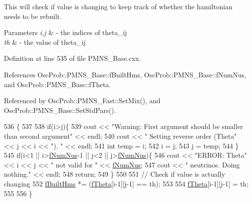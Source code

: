 This will check if value is changing to keep track of whether the hamiltonian needs to be rebuilt.


\begin{DoxyParams}{Parameters}
{\em i,j} & -\/ the indices of theta\+\_\+ij \\
\hline
{\em th} & -\/ the value of theta\+\_\+ij \\
\hline
\end{DoxyParams}


Definition at line 535 of file P\+M\+N\+S\+\_\+\+Base.\+cxx.



References Osc\+Prob\+::\+P\+M\+N\+S\+\_\+\+Base\+::f\+Built\+Hms, Osc\+Prob\+::\+P\+M\+N\+S\+\_\+\+Base\+::f\+Num\+Nus, and Osc\+Prob\+::\+P\+M\+N\+S\+\_\+\+Base\+::f\+Theta.



Referenced by Osc\+Prob\+::\+P\+M\+N\+S\+\_\+\+Fast\+::\+Set\+Mix(), and Osc\+Prob\+::\+P\+M\+N\+S\+\_\+\+Base\+::\+Set\+Std\+Pars().


\begin{DoxyCode}
536 \{
537 
538   \textcolor{keywordflow}{if}(i>j)\{
539     cout << \textcolor{stringliteral}{"Warning: First argument should be smaller than second argument"} << endl;
540     cout << \textcolor{stringliteral}{"         Setting reverse order (Theta"} << j << i << \textcolor{stringliteral}{"). "} << endl;
541     \textcolor{keywordtype}{int} temp = i;
542     i = j;
543     j = temp;
544   \}
545   \textcolor{keywordflow}{if}(i<1 || i>\hyperlink{classOscProb_1_1PMNS__Base_a24bb74bed63569dfe88b18fa6a08060e}{fNumNus}-1 || j<2 || j>\hyperlink{classOscProb_1_1PMNS__Base_a24bb74bed63569dfe88b18fa6a08060e}{fNumNus})\{
546     cout << \textcolor{stringliteral}{"ERROR: Theta"} << i << j << \textcolor{stringliteral}{" not valid for "} << \hyperlink{classOscProb_1_1PMNS__Base_a24bb74bed63569dfe88b18fa6a08060e}{fNumNus};
547     cout << \textcolor{stringliteral}{" neutrinos. Doing nothing."} << endl;
548     \textcolor{keywordflow}{return};
549   \}
550 
551   \textcolor{comment}{// Check if value is actually changing}
552   \hyperlink{classOscProb_1_1PMNS__Base_a9ac3cadeac8db1b90f3152f476244780}{fBuiltHms} *= (\hyperlink{classOscProb_1_1PMNS__Base_a1976887cd658dd86b2336c181f1470b4}{fTheta}[i-1][j-1] == th);
553 
554   \hyperlink{classOscProb_1_1PMNS__Base_a1976887cd658dd86b2336c181f1470b4}{fTheta}[i-1][j-1] = th;
555 
556 \}
\end{DoxyCode}
\mbox{\label{classOscProb_1_1PMNS__Base_aba565962a440d14bee7a2a96d2eca2c5}} 
